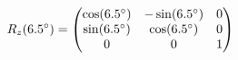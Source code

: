 \documentclass[preview]{standalone}
\begin{document}
\begin{align*}
\special{dvisvgm:raw <g id='unique000'>}R_z(6.5^\circ) = \begin{pmatrix} \cos(6.5^\circ) & -\sin(6.5^\circ) & 0 \\ \sin(6.5^\circ) & \cos(6.5^\circ) & 0 \\ 0 & 0 & 1 \end{pmatrix}\special{dvisvgm:raw </g>}
\end{align*}
\end{document}
